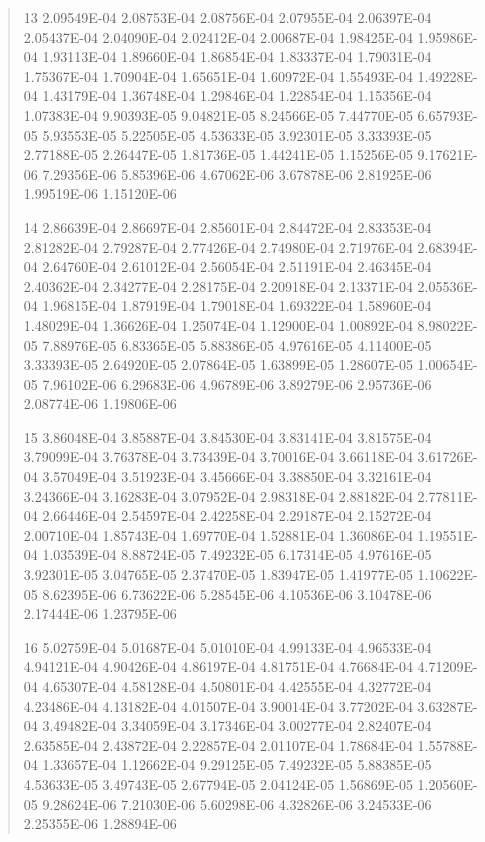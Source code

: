 \documentclass[letterpaper,10pt,english]{sphinxmanual}
\begin{document}
\begin{quote}
\begin{DUlineblock}{0em}
\item[] 13   2.09549E-04  2.08753E-04  2.08756E-04  2.07955E-04  2.06397E-04  2.05437E-04  2.04090E-04  2.02412E-04  2.00687E-04  1.98425E-04  1.95986E-04  1.93113E-04  1.89660E-04  1.86854E-04  1.83337E-04  1.79031E-04  1.75367E-04  1.70904E-04  1.65651E-04  1.60972E-04  1.55493E-04  1.49228E-04  1.43179E-04  1.36748E-04  1.29846E-04  1.22854E-04  1.15356E-04  1.07383E-04  9.90393E-05  9.04821E-05  8.24566E-05  7.44770E-05  6.65793E-05  5.93553E-05  5.22505E-05  4.53633E-05  3.92301E-05  3.33393E-05  2.77188E-05  2.26447E-05  1.81736E-05  1.44241E-05  1.15256E-05  9.17621E-06  7.29356E-06  5.85396E-06  4.67062E-06  3.67878E-06  2.81925E-06  1.99519E-06  1.15120E-06
\item[] 14   2.86639E-04  2.86697E-04  2.85601E-04  2.84472E-04  2.83353E-04  2.81282E-04  2.79287E-04  2.77426E-04  2.74980E-04  2.71976E-04  2.68394E-04  2.64760E-04  2.61012E-04  2.56054E-04  2.51191E-04  2.46345E-04  2.40362E-04  2.34277E-04  2.28175E-04  2.20918E-04  2.13371E-04  2.05536E-04  1.96815E-04  1.87919E-04  1.79018E-04  1.69322E-04  1.58960E-04  1.48029E-04  1.36626E-04  1.25074E-04  1.12900E-04  1.00892E-04  8.98022E-05  7.88976E-05  6.83365E-05  5.88386E-05  4.97616E-05  4.11400E-05  3.33393E-05  2.64920E-05  2.07864E-05  1.63899E-05  1.28607E-05  1.00654E-05  7.96102E-06  6.29683E-06  4.96789E-06  3.89279E-06  2.95736E-06  2.08774E-06  1.19806E-06
\item[] 15   3.86048E-04  3.85887E-04  3.84530E-04  3.83141E-04  3.81575E-04  3.79099E-04  3.76378E-04  3.73439E-04  3.70016E-04  3.66118E-04  3.61726E-04  3.57049E-04  3.51923E-04  3.45666E-04  3.38850E-04  3.32161E-04  3.24366E-04  3.16283E-04  3.07952E-04  2.98318E-04  2.88182E-04  2.77811E-04  2.66446E-04  2.54597E-04  2.42258E-04  2.29187E-04  2.15272E-04  2.00710E-04  1.85743E-04  1.69770E-04  1.52881E-04  1.36086E-04  1.19551E-04  1.03539E-04  8.88724E-05  7.49232E-05  6.17314E-05  4.97616E-05  3.92301E-05  3.04765E-05  2.37470E-05  1.83947E-05  1.41977E-05  1.10622E-05  8.62395E-06  6.73622E-06  5.28545E-06  4.10536E-06  3.10478E-06  2.17444E-06  1.23795E-06
\item[] 16   5.02759E-04  5.01687E-04  5.01010E-04  4.99133E-04  4.96533E-04  4.94121E-04  4.90426E-04  4.86197E-04  4.81751E-04  4.76684E-04  4.71209E-04  4.65307E-04  4.58128E-04  4.50801E-04  4.42555E-04  4.32772E-04  4.23486E-04  4.13182E-04  4.01507E-04  3.90014E-04  3.77202E-04  3.63287E-04  3.49482E-04  3.34059E-04  3.17346E-04  3.00277E-04  2.82407E-04  2.63585E-04  2.43872E-04  2.22857E-04  2.01107E-04  1.78684E-04  1.55788E-04  1.33657E-04  1.12662E-04  9.29125E-05  7.49232E-05  5.88385E-05  4.53633E-05  3.49743E-05  2.67794E-05  2.04124E-05  1.56869E-05  1.20560E-05  9.28624E-06  7.21030E-06  5.60298E-06  4.32826E-06  3.24533E-06  2.25355E-06  1.28894E-06

\end{DUlineblock}
\end{quote}
\end{document}
